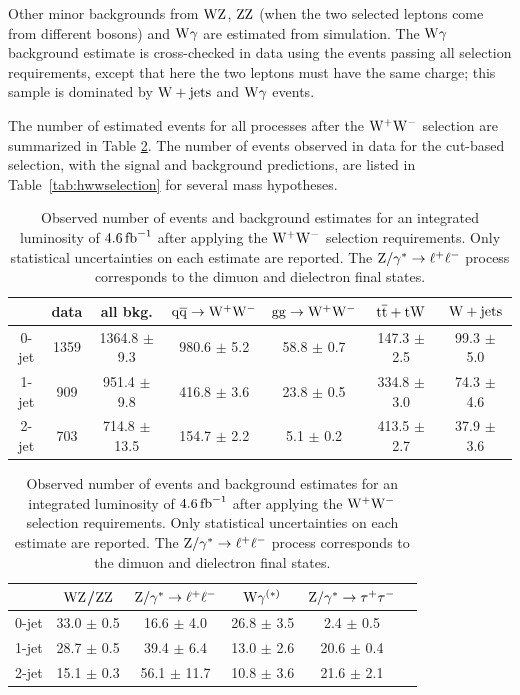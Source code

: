 \documentclass[12pt,twoside,a4paper,cmspaper,final,collab]{cms-tdr}
\begin{document}
Other minor backgrounds from $\mathrm{W}\mathrm{Z}$, $\mathrm{Z}\mathrm{Z}$ (when the two selected leptons come from
different bosons) and $\mathrm{W}\gamma$ are estimated from simulation.
The $\mathrm{W}\gamma$ background estimate is cross-checked in data using the events passing
all selection requirements, except that here the two leptons must have the
same charge; this sample is dominated by $\mathrm{W}+\mathrm{jets}$ and $\mathrm{W}\gamma$
events.

The number of estimated events for all processes after the $\mathrm{W^+}{}\mathrm{W^-}$ selection
are summarized in Table \ref{tab:wwselection_all}. The number of events
observed in data for the cut-based selection, with the signal and
background predictions, are listed in Table~\ref{tab:hwwselection} for several
mass hypotheses.

\begin{table}[htbp]
  \begin{center}
    \caption{Observed number of events and background estimates for
    an integrated luminosity of $4.6\mbox{\ensuremath{\,\text{fb}^\text{$-$1}}}$ after applying the $\mathrm{W^+}{}\mathrm{W^-}$ selection requirements.
    Only statistical uncertainties on each estimate are reported.
    The $\mathrm{Z}/\gamma^*\to \ell^+\ell^-$ process corresponds to the dimuon and dielectron final states.}
     {
     \small
     \setlength{\extrarowheight}{1pt}
      \begin{tabular} {|c|c|c|c|c|c|c|}
\hline
          &   data & all bkg. & $\mathrm{q}\mathrm{\overline{q}} \to \mathrm{W^+}{}\mathrm{W^-}$ & $\mathrm{g}\mathrm{g} \to \mathrm{W^+}{}\mathrm{W^-}$ &  $\mathrm{t}\overline{\mathrm{t}}+\mathrm{t}\mathrm{W}$   & $\mathrm{W}+\mathrm{jets}$    \\
  \hline
  \hline
 0-jet & 1359 & 1364.8 $\pm$    9.3 &  980.6 $\pm$    5.2 &   58.8 $\pm$    0.7 &  147.3 $\pm$    2.5 &   99.3 $\pm$    5.0 \\
 1-jet &  909 &  951.4 $\pm$    9.8 &  416.8 $\pm$    3.6 &   23.8 $\pm$    0.5 &  334.8 $\pm$    3.0 &   74.3 $\pm$	4.6  \\
 2-jet &  703 &  714.8 $\pm$   13.5 &  154.7 $\pm$    2.2 &    5.1 $\pm$    0.2 &  413.5 $\pm$    2.7 &   37.9 $\pm$	3.6  \\
 \hline
 \hline
  \end{tabular}

  \begin{tabular} {|c|c|c|c|c|c|}
  \hline
       & $\mathrm{W}\mathrm{Z}$/$\mathrm{Z}\mathrm{Z}$ & $\mathrm{Z}/\gamma^*\to \ell^+\ell^-$ & $\mathrm{W}\gamma^{(*)}$ & $\mathrm{Z}/\gamma^* \to\tau^+\tau^-$ \\
       \hline
       \hline
       0-jet & 33.0 $\pm$ 0.5  & 16.6 $\pm$    4.0 &   26.8 $\pm$    3.5 &    2.4 $\pm$    0.5 \\
       1-jet & 28.7 $\pm$ 0.5  & 39.4 $\pm$    6.4 &   13.0 $\pm$    2.6 &   20.6 $\pm$    0.4 \\
       2-jet & 15.1 $\pm$ 0.3  & 56.1 $\pm$   11.7 &   10.8 $\pm$    3.6 &   21.6 $\pm$    2.1 \\
       \hline
       \hline
       \end{tabular}
  }
   \label{tab:wwselection_all}
  \end{center}
\end{table}
\end{document}
